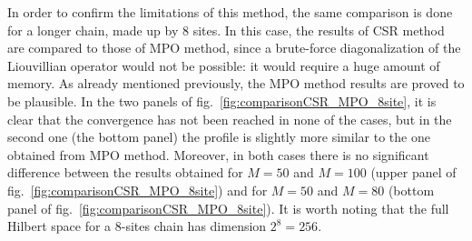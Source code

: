 In order to confirm the limitations of this method, the same comparison is done for a longer chain, made up by 8 sites. In this case, the results of CSR method are compared to those of MPO method, since a brute-force diagonalization of the Liouvillian operator would not be possible: it would require a huge amount of memory. As already mentioned previously, the MPO method results are proved to be plausible. In the two panels of fig.~\ref{fig:comparisonCSR_MPO_8site}, it is clear that the convergence has not been reached in none of the cases, but in the second one (the bottom panel) the profile is slightly more similar to the one obtained from MPO method. Moreover, in both cases there is no significant difference between the results obtained for $M = 50$ and $M = 100$ (upper panel of fig.~\ref{fig:comparisonCSR_MPO_8site}) and for $M = 50$ and $M = 80$ (bottom panel of fig.~\ref{fig:comparisonCSR_MPO_8site}). It is worth noting that the full Hilbert space for a 8-sites chain has dimension $2^{8} = 256$.

